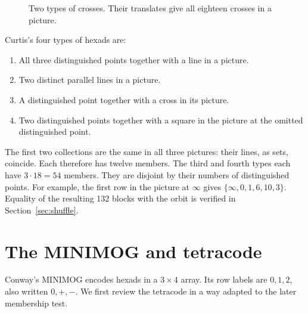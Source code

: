 \documentclass[12pt,letterpaper]{article}
\theoremstyle{definition}\newtheorem{example}[theorem]{Example}
\numberwithin{equation}{section}
\begin{document}
\begin{figure}[ht]
\centering
{}
\caption{Two types of crosses. Their translates give all eighteen crosses in a picture.}
\label{fig:cross}
\end{figure}

Curtis's four types of hexads \cite{Cu84} are:
\begin{enumerate}
\item All three distinguished points together with a line in a picture.
\item Two distinct parallel lines in a picture.
\item A distinguished point together with a cross in its picture.
\item Two distinguished points together with a square in the picture at the omitted distinguished point.
\end{enumerate}
The first two collections are the same in all three pictures: their lines, as sets, coincide. Each therefore has twelve members. The third and fourth types each have $3\cdot18=54$ members. They are disjoint by their numbers of distinguished points. For example, the first row in the picture at $\infty$ gives $\{\infty,0,1,6,10,3\}$. Equality of the resulting 132 blocks with the orbit is verified in Section~\ref{sec:shuffle}.

\section{The MINIMOG and tetracode}\label{sec:minimog}
Conway's MINIMOG encodes hexads in a $3\times4$ array. Its row labels are $0,1,2$, also written $0,+,-$. We first review the tetracode in a way adapted to the later membership test.
\end{document}
